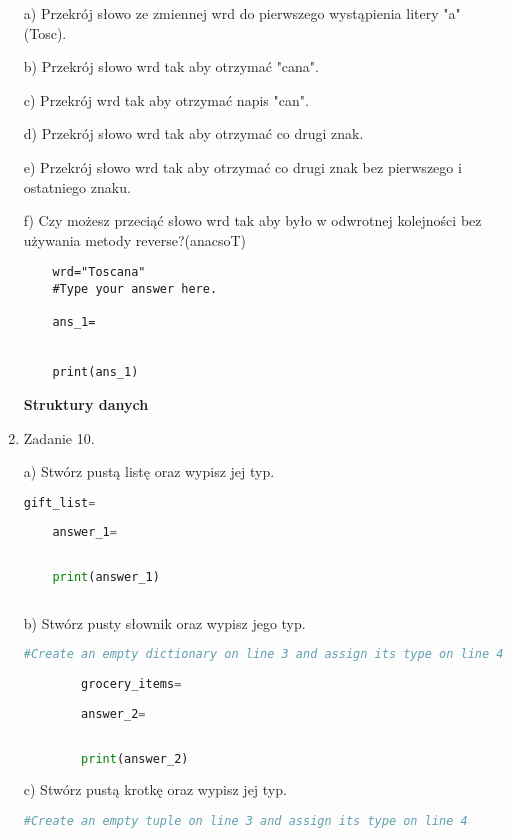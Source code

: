 \documentclass[11pt]{article}
\begin{document}
\begin{enumerate}
a) Przekrój słowo ze zmiennej wrd do pierwszego wystąpienia litery "a" (Tosc).
\par
b) Przekrój słowo wrd tak aby otrzymać "cana".
\par
c) Przekrój wrd tak aby otrzymać napis "can".
\par
d) Przekrój słowo wrd tak aby otrzymać co drugi znak.
\par
e) Przekrój słowo wrd tak aby otrzymać co drugi znak bez pierwszego i ostatniego znaku.
\par
f) Czy możesz przeciąć słowo wrd tak aby było w odwrotnej kolejności bez używania metody reverse?(anacsoT)
\begin{lstlisting}
	wrd="Toscana"
	#Type your answer here.
	
	ans_1=
	
	
	print(ans_1)
\end{lstlisting}






\medskip
\begin{Large}
	\textbf{Struktury danych}
\end{Large}

	\item
	\begin{Large}
		Zadanie 10.
	\end{Large} 
	\par
	a) Stwórz pustą listę oraz wypisz jej typ.
	\begin{lstlisting}[language=Python]
	gift_list=
	
	answer_1=
	
	
	print(answer_1)
	
	\end{lstlisting}
\par
b) Stwórz pusty słownik oraz wypisz jego typ.

	\begin{lstlisting}[language=Python]
		#Create an empty dictionary on line 3 and assign its type on line 4
		
		grocery_items=
		
		answer_2=
		
		
		print(answer_2)
	\end{lstlisting}
\par
c) Stwórz pustą krotkę oraz wypisz jej typ.

\begin{lstlisting}[language=Python]
	#Create an empty tuple on line 3 and assign its type on line 4
	

\end{lstlisting}
\end{enumerate}
\end{document}
